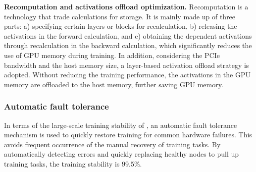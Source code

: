 \textbf{Recomputation and activations offload optimization.} Recomputation is a technology that trade calculations for storage. 
It is mainly made up of three parts: a) specifying certain layers or blocks for recalculation, b) releasing the activations in the forward calculation, and c) obtaining the dependent activations through recalculation in the backward calculation, which significantly reduces the use of GPU memory during training.
In addition, considering the PCIe bandwidth and the host memory size, a layer-based activation offload strategy is adopted. Without reducing the training performance, the activations in the GPU memory are offloaded to the host memory, further saving GPU memory.

\subsubsection{Automatic fault tolerance}
In terms of the large-scale training stability of \nameofmethod{}, an automatic fault tolerance mechanism is used to quickly restore training for common hardware failures.
This avoids frequent occurrence of the manual recovery of training tasks.
By automatically detecting errors and quickly replacing healthy nodes to pull up training tasks, the training stability is 99.5\%.